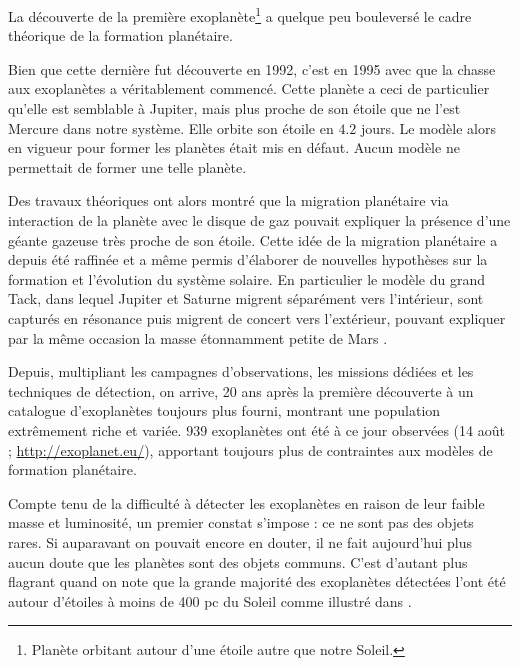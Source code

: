 La découverte de la première exoplanète\footnote{Planète orbitant autour d'une étoile autre que notre Soleil.} \citep{wolszczan1992planetary} a quelque peu bouleversé le cadre théorique de la formation planétaire.

Bien que cette dernière fut découverte en 1992, c'est en 1995 avec  \citep{mayor1995jupiter} que la chasse aux exoplanètes a véritablement commencé. Cette planète a ceci de particulier qu'elle est semblable à Jupiter, mais plus proche de son étoile que ne l'est Mercure dans notre système. Elle orbite son étoile en $4.2$ jours. Le modèle alors en vigueur pour former les planètes était mis en défaut. Aucun modèle ne permettait de former une telle planète. 

Des travaux théoriques ont alors montré que la migration planétaire via interaction de la planète avec le disque de gaz pouvait expliquer la présence d'une géante gazeuse très proche de son étoile. Cette idée de la migration planétaire a depuis été raffinée et a même permis d'élaborer de nouvelles hypothèses sur la formation et l'évolution du système solaire. En particulier le modèle du \og grand Tack\fg \citep{morbidelli2007dynamics, pierens2011twophase}, dans lequel Jupiter et Saturne migrent séparément vers l'intérieur, sont capturés en résonance puis migrent de concert vers l'extérieur, pouvant expliquer par la même occasion la masse étonnamment petite de Mars \citep{walsh2011low}. 

Depuis, multipliant les campagnes d'observations, les missions dédiées et les techniques de détection, on arrive, 20 ans après la première découverte à un catalogue d'exoplanètes toujours plus fourni, montrant une population extrêmement riche et variée. 939 exoplanètes ont été à ce jour observées (14 août ; \url{http://exoplanet.eu/}), apportant toujours plus de contraintes aux modèles de formation planétaire. 

Compte tenu de la difficulté à détecter les exoplanètes en raison de leur faible masse et luminosité, un premier constat s'impose : ce ne sont pas des objets rares. Si auparavant on pouvait encore en douter, il ne fait aujourd'hui plus aucun doute que les planètes sont des objets communs. C'est d'autant plus flagrant quand on note que la grande majorité des exoplanètes détectées l'ont été autour d'étoiles à moins de 400 pc du Soleil comme illustré dans . 

